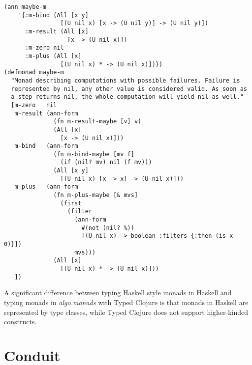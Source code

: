\begin{lstlisting}[caption=Typed maybe monad definition, label=lst:maybemtyped]
(ann maybe-m
    '{:m-bind (All [x y]
                [(U nil x) [x -> (U nil y)] -> (U nil y)])
      :m-result (All [x]
                  [x -> (U nil x)])
      :m-zero nil
      :m-plus (All [x]
                [(U nil x) * -> (U nil x)])})
(defmonad maybe-m
  "Monad describing computations with possible failures. Failure is
  represented by nil, any other value is considered valid. As soon as
  a step returns nil, the whole computation will yield nil as well."
  [m-zero   nil
   m-result (ann-form 
              (fn m-result-maybe [v] v)
              (All [x] 
                [x -> (U nil x)]))
   m-bind   (ann-form 
              (fn m-bind-maybe [mv f]
                (if (nil? mv) nil (f mv)))
              (All [x y]
                [(U nil x) [x -> x] -> (U nil x)]))
   m-plus   (ann-form 
              (fn m-plus-maybe [& mvs]
                (first 
                  (filter
                    (ann-form 
                      #(not (nil? %))
                      [(U nil x) -> boolean :filters {:then (is x 0)}])
                    mvs)))
              (All [x]
                [(U nil x) * -> (U nil x)]))
   ])
\end{lstlisting}



A significant difference between typing Haskell style monads in Haskell and typing monads in \emph{algo.monads} with Typed Clojure
is that monads in Haskell are represented by type classes, while Typed Clojure does not support higher-kinded
constructs.

\section{Conduit}
